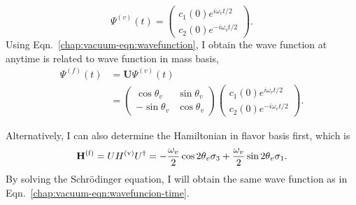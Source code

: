 \begin{equation}
\Psi^{(v)}(t) = \begin{pmatrix}
c_1(0) e^{i \omega_v t/2 } \\
c_2(0) e^{ -i\omega_v t/2 }
\end{pmatrix}.
\end{equation}
Using Eqn.~\ref{chap:vacuum-eqn:wavefunction}, I obtain the wave function at anytime is related to wave function in mass basis,
\begin{align}
\Psi^{(f)}(t) &= \mathbf{U}\Psi^{(v)}(t) \\
& = \begin{pmatrix} \cos\theta_v & \sin \theta_v \\ -\sin \theta_v & \cos \theta_v \end{pmatrix} \begin{pmatrix} c_1(0) e^{i\omega_v t/2 } \\
c_2(0) e^{ -i\omega_v t/2 }    \end{pmatrix} .
\label{chap:vacuum-eqn:wavefuncion-time}
\end{align}

Alternatively, I can also determine the Hamiltonian in flavor basis first, which is
\begin{equation}
\mathbf H^{(\ff)} = U H^{(\vv)} U^\dagger = -\frac{\omega_v}{2}\cos 2\theta_v \sigma_3 + \frac{\omega_v}{2} \sin 2\theta_v \sigma_1.
    \label{chap:basics-sec:vacuum-osc-eqn:hamiltonian-vacuum}
\end{equation}
By solving the Schr\"{o}dinger equation, I will obtain the same wave function as in Eqn.~\ref{chap:vacuum-eqn:wavefuncion-time}.


